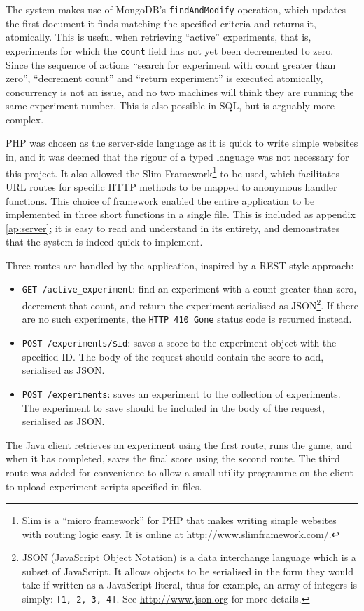 
The system makes use of MongoDB's {\tt findAndModify} operation, which updates the first document it finds matching the specified criteria and returns it, atomically.  This is useful when retrieving ``active'' experiments, that is, experiments for which the {\tt count} field has not yet been decremented to zero.  Since the sequence of actions ``search for experiment with count greater than zero'', ``decrement count'' and ``return experiment'' is executed atomically, concurrency is not an issue, and no two machines will think they are running the same experiment number.  This is also possible in SQL, but is arguably more complex.

PHP was chosen as the server-side language as it is quick to write simple websites in, and it was deemed that the rigour of a typed language was not necessary for this project.  It also allowed the Slim Framework\footnote{Slim is a ``micro framework'' for PHP that makes writing simple websites with routing logic easy.  It is online at \url{http://www.slimframework.com/}.} to be used, which facilitates URL routes for specific HTTP methods to be mapped to anonymous handler functions.  This choice of framework enabled the entire application to be implemented in three short functions in a single file.  This is included as appendix \ref{ap:server}; it is easy to read and understand in its entirety, and demonstrates that the system is indeed quick to implement.

Three routes are handled by the application, inspired by a REST style approach:

\begin{itemize}
\item {\tt GET /active\_experiment}: find an experiment with a count greater than zero, decrement that count, and return the experiment serialised as JSON\footnote{JSON (JavaScript Object Notation) is a data interchange language which is a subset of JavaScript.  It allows objects to be serialised in the form they would take if written as a JavaScript literal, thus for example, an array of integers is simply: {\tt [1, 2, 3, 4]}.  See \url{http://www.json.org} for more details.}.  If there are no such experiments, the {\tt HTTP 410 Gone} status code is returned instead.
\item {\tt POST /experiments/\$id}: saves a score to the experiment object with the specified ID.  The body of the request should contain the score to add, serialised as JSON.
\item {\tt POST /experiments}: saves an experiment to the collection of experiments.  The experiment to save should be included in the body of the request, serialised as JSON.
\end{itemize}

The Java client retrieves an experiment using the first route, runs the game, and when it has completed, saves the final score using the second route.  The third route was added for convenience to allow a small utility programme on the client to upload experiment scripts specified in files.



